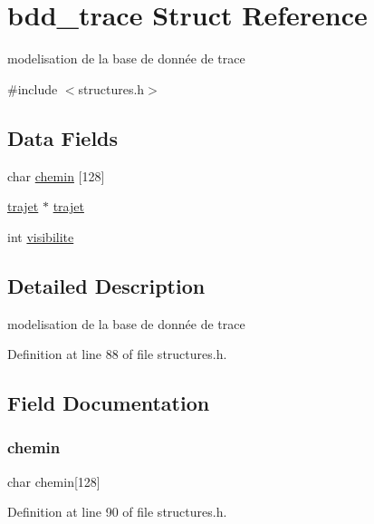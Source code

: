 \hypertarget{structbdd__trace}{}\section{bdd\+\_\+trace Struct Reference}
\label{structbdd__trace}


modelisation de la base de donnée de trace  




{\ttfamily \#include $<$structures.\+h$>$}

\subsection*{Data Fields}
\begin{DoxyCompactItemize}
\item 
char \hyperlink{structbdd__trace_afea51aac2a88c01d5ad5f97fc91ec472}{chemin} \mbox{[}128\mbox{]}
\item 
\hyperlink{structtrajet}{trajet} $\ast$ \hyperlink{structbdd__trace_ad417eb03de659793c712421b340fbec4}{trajet}
\item 
int \hyperlink{structbdd__trace_aa34b47a3ed3a7dfed8a672132bcc3f2a}{visibilite}
\end{DoxyCompactItemize}


\subsection{Detailed Description}
modelisation de la base de donnée de trace 

Definition at line 88 of file structures.\+h.



\subsection{Field Documentation}
\hypertarget{structbdd__trace_afea51aac2a88c01d5ad5f97fc91ec472}{}\label{structbdd__trace_afea51aac2a88c01d5ad5f97fc91ec472} 
\subsubsection{\texorpdfstring{chemin}{chemin}}
{\footnotesize\ttfamily char chemin\mbox{[}128\mbox{]}}



Definition at line 90 of file structures.\+h.

